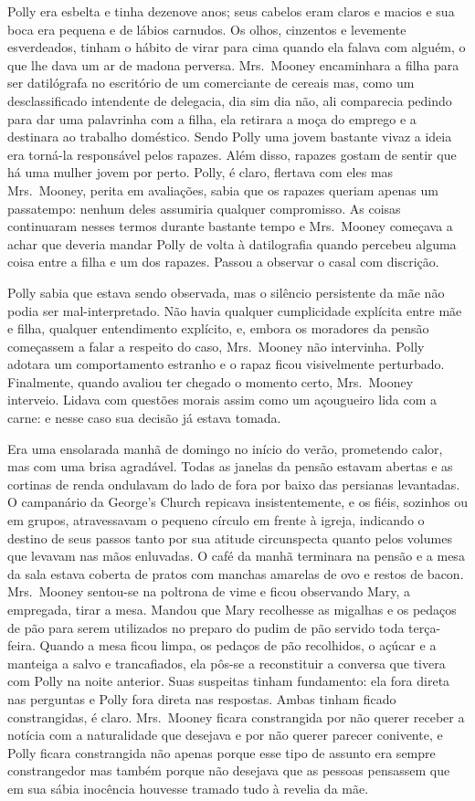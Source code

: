 Polly era esbelta e tinha dezenove anos; seus cabelos eram claros e macios e
sua boca era pequena e de lábios carnudos.  Os olhos, cinzentos e levemente
esverdeados, tinham o hábito de virar para cima quando ela falava com alguém, o
que lhe dava um ar de madona perversa.  Mrs.~Mooney encaminhara a filha para
ser datilógrafa no escritório de um comerciante de cereais mas, como um
desclassificado intendente de delegacia, dia sim dia não, ali comparecia
pedindo para dar uma palavrinha com a filha, ela retirara a moça do emprego e a
destinara ao trabalho doméstico.  Sendo Polly uma jovem bastante vivaz a ideia
era torná-la responsável pelos rapazes.  Além disso, rapazes gostam de sentir
que há uma mulher jovem por perto.  Polly, é claro, flertava com eles mas 
Mrs.~Mooney, perita em avaliações, sabia que os rapazes queriam apenas um
passatempo: nenhum deles assumiria qualquer compromisso.  As coisas continuaram
nesses termos durante bastante tempo e Mrs.~Mooney começava a achar que deveria
mandar Polly de volta à datilografia quando percebeu alguma coisa entre a filha
e um dos rapazes.  Passou a observar o casal com discrição.

Polly sabia que estava sendo observada, mas o silêncio persistente da mãe não
podia ser mal-interpretado.  Não havia qualquer cumplicidade explícita entre
mãe e filha, qualquer entendimento explícito, e, embora os moradores da pensão
começassem a falar a respeito do caso, Mrs.~Mooney não intervinha.  Polly
adotara um comportamento estranho e o rapaz ficou visivelmente perturbado.
Finalmente, quando avaliou ter chegado o momento certo, Mrs.~Mooney interveio.
Lidava com questões morais assim como um açougueiro lida com a carne: e nesse
caso sua decisão já estava tomada.

Era uma ensolarada manhã de domingo no início do verão, prometendo calor, mas
com uma brisa agradável.  Todas as janelas da pensão estavam abertas e as
cortinas de renda ondulavam do lado de fora por baixo das persianas levantadas.
O campanário da George’s Church repicava insistentemente, e os fiéis, sozinhos
ou em grupos, atravessavam o pequeno círculo em frente à igreja, indicando o
destino de seus passos tanto por sua atitude circunspecta quanto pelos volumes
que levavam nas mãos enluvadas.  O café da manhã terminara na pensão e a mesa
da sala estava coberta de pratos com manchas amarelas de ovo e restos de bacon.
Mrs.~Mooney sentou-se na poltrona de vime e ficou observando Mary, a empregada,
tirar a mesa.  Mandou que Mary recolhesse as migalhas e os pedaços de pão para
serem utilizados no preparo do pudim de pão servido toda terça-feira.  Quando a
mesa ficou limpa, os pedaços de pão recolhidos, o açúcar e a manteiga a salvo e
trancafiados, ela pôs-se a reconstituir a conversa que tivera com Polly na
noite anterior.  Suas suspeitas tinham fundamento: ela fora direta nas
perguntas e Polly fora direta nas respostas.  Ambas tinham ficado
constrangidas, é claro.  Mrs.~Mooney ficara constrangida por não querer receber
a notícia com a naturalidade que desejava e por não querer parecer conivente, e
Polly ficara constrangida não apenas porque esse tipo de assunto era sempre
constrangedor mas também porque não desejava que as pessoas pensassem que em
sua sábia inocência houvesse tramado tudo à revelia da mãe.

